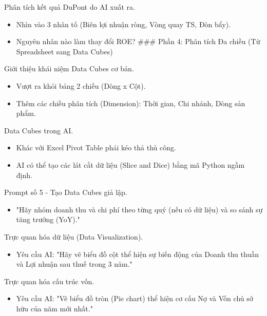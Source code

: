 \documentclass[aspectratio=169]{beamer}
\begin{document}
\begin{frame}{Phân tích kết quả DuPont do AI xuất ra.}
    \begin{itemize}
        \item Nhìn vào 3 nhân tố (Biên lợi nhuận ròng, Vòng quay TS, Đòn bẩy).
        \item Nguyên nhân nào làm thay đổi ROE?
        ### Phần 4: Phân tích Đa chiều (Từ Spreadsheet sang Data Cubes)
    \end{itemize}
\end{frame}


\begin{frame}{Giới thiệu khái niệm Data Cubes cơ bản.}
    \begin{itemize}
        \item Vượt ra khỏi bảng 2 chiều (Dòng x Cột).
        \item Thêm các chiều phân tích (Dimension): Thời gian, Chi nhánh, Dòng sản phẩm.
    \end{itemize}
\end{frame}


\begin{frame}{Data Cubes trong AI.}
    \begin{itemize}
        \item Khác với Excel Pivot Table phải kéo thả thủ công.
        \item AI có thể tạo các lát cắt dữ liệu (Slice and Dice) bằng mã Python ngầm định.
    \end{itemize}
\end{frame}


\begin{frame}{Prompt số 5 - Tạo Data Cubes giả lập.}
    \begin{itemize}
        \item "Hãy nhóm doanh thu và chi phí theo từng quý (nếu có dữ liệu) và so sánh sự tăng trưởng (YoY)."
    \end{itemize}
\end{frame}


\begin{frame}{Trực quan hóa dữ liệu (Data Visualization).}
    \begin{itemize}
        \item Yêu cầu AI: "Hãy vẽ biểu đồ cột thể hiện sự biến động của Doanh thu thuần và Lợi nhuận sau thuế trong 3 năm."
    \end{itemize}
\end{frame}


\begin{frame}{Trực quan hóa cấu trúc vốn.}
    \begin{itemize}
        \item Yêu cầu AI: "Vẽ biểu đồ tròn (Pie chart) thể hiện cơ cấu Nợ và Vốn chủ sở hữu của năm mới nhất."
    \end{itemize}
\end{frame}
\end{document}
